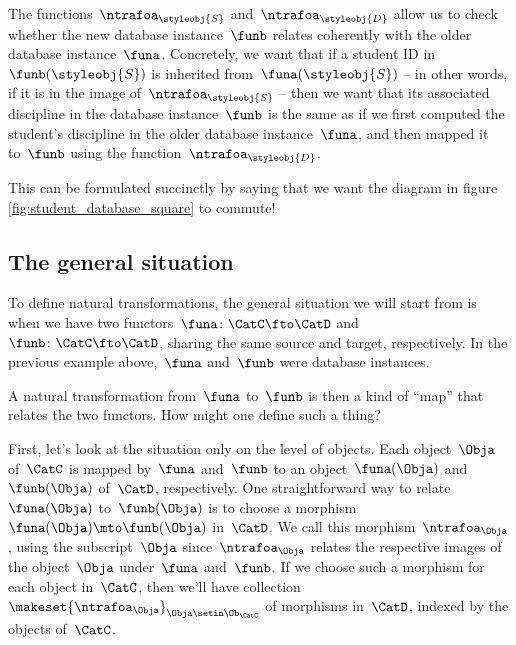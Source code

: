 The functions~$\ntrafoa_\styleobj{S}$ and~$\ntrafoa_\styleobj{D}$ allow us to check whether the new database instance~$\funb$ relates coherently with the older database instance~$\funa$.
Concretely, we want that if a student ID in~$\funb(\styleobj{S})$ is inherited from~$\funa(\styleobj{S})$ -- in other words, if it is in the image of~$\ntrafoa_{\styleobj{S}}$ --  then we want that its associated discipline in the database instance~$\funb$ is the same as if we first computed the student's discipline in the older database instance~$\funa$, and then mapped it to~$\funb$ using the function~$\ntrafoa_{\styleobj{D}}$.

%
\begin{marginfigure}
    \centering
    \caption{}
    \label{fig:student_database_square}
\end{marginfigure}
%

This can be formulated succinctly by saying that we want the diagram in figure \cref{fig:student_database_square} to commute!

\subsection{The general situation}

To define natural transformations, the general situation we will start from is when we have two functors~$\funa \colon \CatC \fto \CatD$  and~$\funb \colon \CatC \fto \CatD$, sharing the same source and target, respectively.
In the previous example above,~$\funa$ and~$\funb$ were database instances.

A natural transformation from~$\funa$ to~$\funb$ is then a kind of ``map'' that relates the two functors.
How might one define such a thing?

First, let's look at the situation only on the level of objects.
Each object~$\Obja$ of~$\CatC$ is mapped by~$\funa$ and~$\funb$ to an object~$\funa(\Obja)$ and~$\funb(\Obja)$ of~$\CatD$, respectively.
One straightforward way to relate~$\funa(\Obja)$ to~$\funb(\Obja)$ is to choose a morphism~$\funa(\Obja) \mto \funb(\Obja)$ in~$\CatD$.
We call this morphism~$\ntrafoa_{\Obja}$, using the subscript~$\Obja$ since~$\ntrafoa_{\Obja}$ relates the respective images of the object~$\Obja$ under~$\funa$ and~$\funb$.
If we choose such a morphism for each object in~$\CatC$, then we'll have collection~$\makeset{ \ntrafoa_\Obja }_{\Obja \setin \Ob_\CatC}$ of morphisms in~$\CatD$, indexed by the objects of~$\CatC$.

